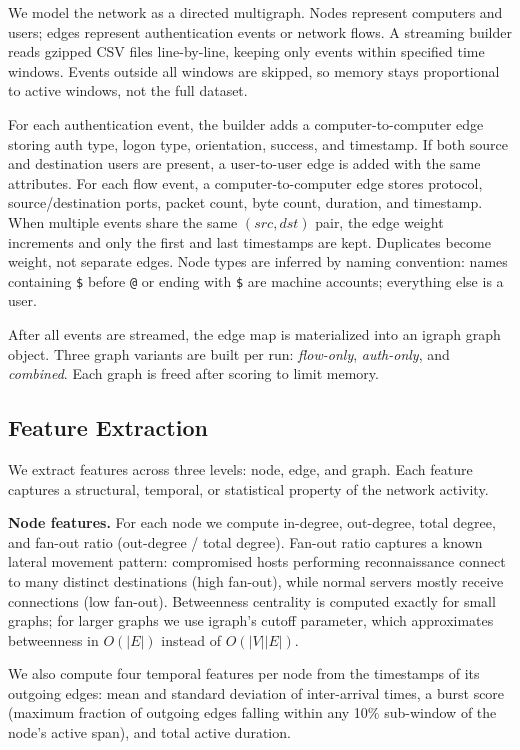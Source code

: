 \documentclass[letterpaper,twocolumn,10pt]{article}
\begin{document}
We model the network as a directed multigraph. Nodes represent computers and users; edges represent authentication events or network flows. A streaming builder reads gzipped CSV files line-by-line, keeping only events within specified time windows. Events outside all windows are skipped, so memory stays proportional to active windows, not the full dataset.

For each authentication event, the builder adds a computer-to-computer edge storing auth type, logon type, orientation, success, and timestamp. If both source and destination users are present, a user-to-user edge is added with the same attributes. For each flow event, a computer-to-computer edge stores protocol, source/destination ports, packet count, byte count, duration, and timestamp. When multiple events share the same $(src, dst)$ pair, the edge weight increments and only the first and last timestamps are kept. Duplicates become weight, not separate edges. Node types are inferred by naming convention: names containing \texttt{\$} before \texttt{@} or ending with \texttt{\$} are machine accounts; everything else is a user.

After all events are streamed, the edge map is materialized into an igraph graph object. Three graph variants are built per run: \emph{flow-only}, \emph{auth-only}, and \emph{combined}. Each graph is freed after scoring to limit memory.

\subsection{Feature Extraction}

We extract features across three levels: node, edge, and graph. Each feature captures a structural, temporal, or statistical property of the network activity.

\textbf{Node features.}
For each node we compute in-degree, out-degree, total degree, and fan-out ratio (out-degree / total degree). Fan-out ratio captures a known lateral movement pattern: compromised hosts performing reconnaissance connect to many distinct destinations (high fan-out), while normal servers mostly receive connections (low fan-out). Betweenness centrality is computed exactly for small graphs; for larger graphs we use igraph's cutoff parameter, which approximates betweenness in $O(|E|)$ instead of $O(|V||E|)$.

We also compute four temporal features per node from the timestamps of its outgoing edges: mean and standard deviation of inter-arrival times, a burst score (maximum fraction of outgoing edges falling within any 10\% sub-window of the node's active span), and total active duration.
\end{document}

